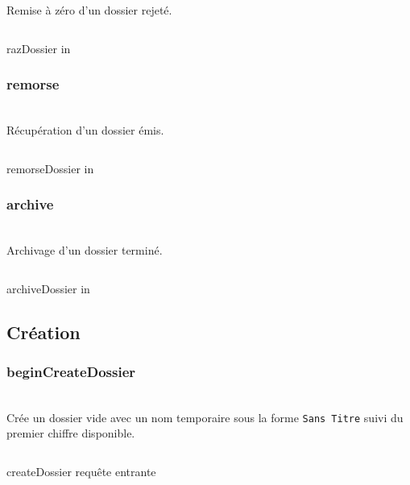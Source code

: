 Remise à zéro d'un dossier rejeté.

\begin{codesnippet}
\inputminted[frame=single,linenos,fontsize=\footnotesize]{javascript}{extraits/razDossier_in.js}
\caption{razDossier in}
\label{snip:razDossier_in}
\end{codesnippet}


\subsubsection{remorse}
\\

Récupération d'un dossier émis.

\begin{codesnippet}
\inputminted[frame=single,linenos,fontsize=\footnotesize]{javascript}{extraits/remorseDossier_in.js}
\caption{remorseDossier in}
\label{snip:remorseDossier_in}
\end{codesnippet}

\subsubsection{archive}
\\

Archivage d'un dossier terminé.

\begin{codesnippet}
\inputminted[frame=single,linenos,fontsize=\footnotesize]{javascript}{extraits/archiveDossier_in.js}
\caption{archiveDossier in}
\label{snip:archiveDossier_in}
\end{codesnippet}

\subsection{Création}

\subsubsection{beginCreateDossier}
\\

Crée un dossier vide avec un nom temporaire sous la forme \verb|Sans Titre| suivi du premier chiffre disponible.

\begin{codesnippet}
\inputminted[frame=single,linenos,fontsize=\footnotesize]{javascript}{extraits/createDossier_in.js}
\caption{createDossier requête entrante}
\label{snip:getDossier_in}
\end{codesnippet}

